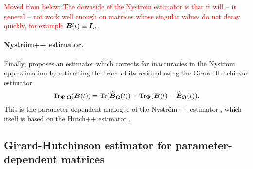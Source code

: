 \textcolor{red}{Moved from below: The downside of the Nyström estimator is that it will -- in general -- not work well enough on matrices whose singular values do not decay quickly, for example $\boldsymbol{B}(t) \equiv \boldsymbol{I}_n$.}

\paragraph{Nyström++ estimator.} Finally, \cite{lin-2017-randomized-estimation} proposes an estimator which corrects for inaccuracies in the Nyström approximation  by estimating the trace of its residual using the Girard-Hutchinson estimator 
\begin{equation}
    \operatorname{Tr}_{\boldsymbol{\Psi}, \boldsymbol{\Omega}}(\boldsymbol{B}(t)) = \operatorname{Tr}(\widehat{\boldsymbol{B}}_{\boldsymbol{\Omega}}(t)) + \operatorname{Tr}_{\boldsymbol{\Psi}}(\boldsymbol{B}(t) - \widehat{\boldsymbol{B}}_{\boldsymbol{\Omega}}(t)).
    \label{equ:nystrompp-trace-estimator}
\end{equation}
This is the parameter-dependent analogue of the Nyström++ estimator \cite{persson-2022-improved-variants}, which itself is based on the Hutch++ estimator \cite{meyer-2021-hutch-optimal}. %

%

\subsection{Girard-Hutchinson estimator for parameter-dependent matrices}
\label{subsec:hutchinson}

